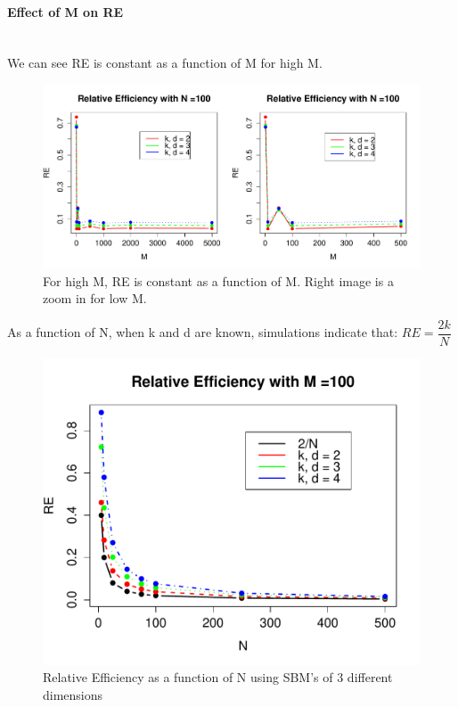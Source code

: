 \documentclass[10pt]{article}
\begin{document}
\paragraph{Effect of M on RE} \mbox{}\\
We can see RE is constant as a function of M for high M.
\begin{figure}[!htb]
	\centering
	\includegraphics[width=18cm]{RPlot07.pdf}
	\caption{ For high M, RE is constant as a function of M.  Right image is a zoom in for low M.}
	\label{fig:plot1}
\end{figure}


\newpage
As a function of N, when k and d are known, simulations indicate that: $RE = \dfrac{2k}{N}$
\begin{figure}[!htb]
	\centering
	\includegraphics[width=12cm]{RPlot02.pdf}
	\caption{ Relative Efficiency as a function of N using SBM's of 3 different dimensions}
	\label{fig:plot1}
\end{figure}
\end{document}
